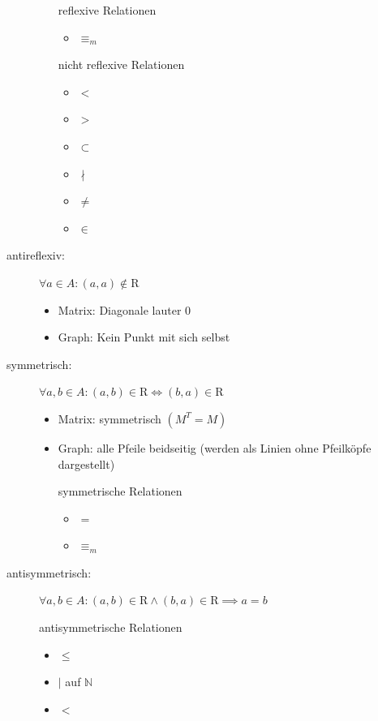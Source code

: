 \begin{description}
\begin{itemize}
\begin{bsp*}{reflexive Relationen}
\begin{itemize}
					\item $\equiv_m$
				\end{itemize}
			\end{bsp*}
			\begin{bsp*}{nicht reflexive Relationen}
				\begin{itemize}
					\item $<$
					\item $>$
					\item $\subset$
					\item $\nmid$
					\item $\neq$
					\item $\in$
				\end{itemize}
			\end{bsp*}
		\end{itemize}
	\item[antireflexiv:] $\forall a \in A : (a , a) \notin \mathrm{R}$
		\begin{itemize}
			\item Matrix: Diagonale lauter $0$
			\item Graph: Kein Punkt mit sich selbst
		\end{itemize}
	\item[symmetrisch:] $\forall a , b \in A : (a , b) \in \mathrm{R} \iff (b , a) \in \mathrm{R}$
		\begin{itemize}
			\item Matrix: symmetrisch $(M^T = M)$
			\item Graph: alle Pfeile beidseitig (werden als Linien ohne Pfeilköpfe dargestellt) \\
			\begin{bsp*}{symmetrische Relationen}
				\begin{itemize}
					\item $=$
					\item $\equiv_m$
				\end{itemize}
			\end{bsp*}
		\end{itemize}
	\item[antisymmetrisch:] $\forall a , b \in A : (a , b) \in \mathrm{R} \wedge (b , a) \in \mathrm{R} \implies a = b$\\
		\begin{bsp*}{antisymmetrische Relationen}
			\begin{itemize}
				\item $\leq$
				\item $|$ auf $\mathbb{N}$
				\item $<$

\end{itemize}
\end{bsp*}
\end{description}
